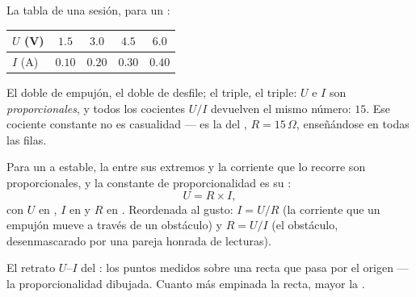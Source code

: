 \begin{example}\label{ex:g8:ohms-law:confession}
La tabla de una sesión, para un :
\begin{center}
\begin{tabular}{l|cccc}
$U$ (\unit{V}) & $1.5$ & $3.0$ & $4.5$ & $6.0$ \\
\hline
$I$ (\unit{A}) & $0.10$ & $0.20$ & $0.30$ & $0.40$
\end{tabular}
\end{center}
El doble de empujón, el doble de desfile; el triple, el triple: $U$ e
$I$ son \emph{proporcionales}, y todos los cocientes $U/I$ devuelven el
mismo número: $15$. Ese cociente constante no es casualidad --- es la
 del , $R = 15\,\Omega$,
enseñándose en todas las filas.
\end{example}

\begin{proposition}\label{prop:g8:ohms-law:law}
Para un  a  estable, la
 entre sus extremos y la corriente que lo recorre son
proporcionales, y la constante de proporcionalidad es su
:
\[
U = R \times I ,
\]
con $U$ en , $I$ en  y $R$ en
. Reordenada al gusto: $I = U/R$ (la corriente que un
empujón mueve a través de un obstáculo) y $R = U/I$ (el obstáculo,
desenmascarado por una pareja honrada de lecturas).
\end{proposition}

\begin{omfigure}

{\small El retrato $U$--$I$ del : los puntos medidos sobre
una recta que pasa por el origen --- la proporcionalidad dibujada.
Cuanto más empinada la recta, mayor la .}
\end{omfigure}

